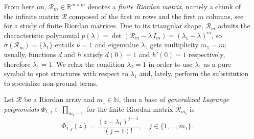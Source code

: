 

From here on, $\mathcal{R}_{m}\in\mathbb{R}^{m\times m}$ denotes a \emph{finite
Riordan matrix}, namely a chunk of the infinite matrix $\mathcal{R}$ composed
of the first $m$ rows and the first $m$ columns, see \citep{LUZON2016239} for a
study of finite Riordan matrices. Due to its triangular shape,
$\mathcal{R}_{m}$ admits the characteristic polynomial $p(\lambda) =
\det{\left(\mathcal{R}_{m}-\lambda\,I_{m} \right)} = \left(\lambda_{1}-\lambda
\right)^{m}$, so $\sigma(\mathcal{R}_{m})= \lbrace \lambda_{1} \rbrace$ entails
$\nu=1$ and eigenvalue $\lambda_{1}$ gets multiplicity $m_{1}=m$; usually,
functions $d$ and $h$ satisfy $d(0)=1$ and $h'(0)=1$ respectively, therefore
$\lambda_{1}=1$.  We relax the condition $\lambda_{1}=1$ in order to use
$\lambda_{1}$ as a pure symbol to spot structures with respect to $\lambda_{1}$
and, lately, perform the substitution to specialize non-ground terms.

\begin{lemma}
Let $\mathcal{R}$ be a Riordan array and $m_{1}\in\mathbb{N}$, then a base of \textit{generalized
Lagrange polynomials} $\Phi_{1,j}\in\prod_{m_1-1}$ for the finite Riordan matrix $\mathcal{R}_{m_{1}}$ is
\begin{equation}
  \label{eq:generalized-Lagrange-polynomials-RA}
  \Phi_{1,j}(z) = \frac{\left(z-\lambda_{1}\right)^{j-1}}{(j-1)!}, 
  \quad j\in \lbrace 1,\ldots, m_{1} \rbrace.
\end{equation}
\end{lemma}

